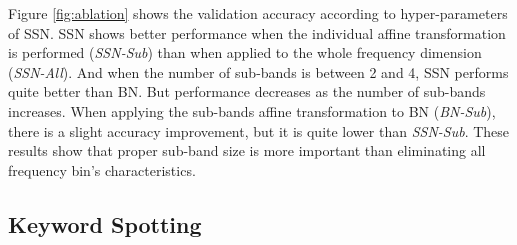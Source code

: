 \documentclass{article}
\begin{document}
Figure \ref{fig:ablation} shows the validation accuracy according to hyper-parameters of SSN. SSN shows better performance when the individual affine transformation is performed (\textit{SSN-Sub}) than when applied to the whole frequency dimension (\textit{SSN-All}). And when the number of sub-bands is between 2 and 4, SSN performs quite better than BN. But performance decreases as the number of sub-bands increases. When applying the sub-bands affine transformation to BN (\textit{BN-Sub}), there is a slight accuracy improvement, but it is quite lower than \textit{SSN-Sub}. 
These results show that proper sub-band size is more important than eliminating all frequency bin's characteristics.

\begin{table}[t]
\caption{Results on Google Speech Command dataset. The numbers marked with  are taken from each paper, and  denotes the result of training the same epoch as \cite{choi2019temporal}.}
\vskip 0.1in
\label{tab:speech}
\end{table}

\subsection{Keyword Spotting}
\end{document}
